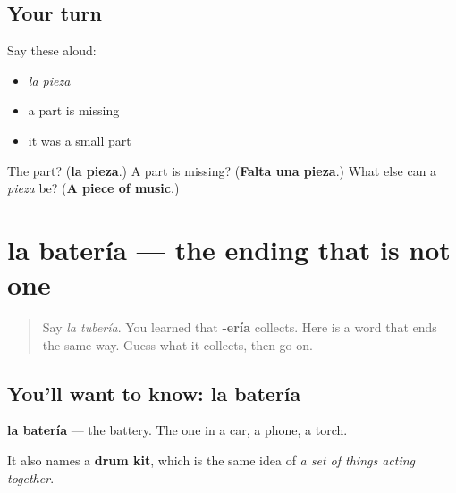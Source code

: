 \subsection*{Your turn}
Say these aloud:

\begin{itemize}
\raggedright
  \item \emph{la pieza}
  \item a part is missing
  \item it was a small part
\end{itemize}

\begin{tcolorbox}[breakable,colback=teal!4,colframe=teal!35!black,title={Before you move on}]
The part? (\textbf{la pieza}.) A part is missing? (\textbf{Falta una pieza}.) What else can a \emph{pieza} be? (\textbf{A piece of music}.)
\end{tcolorbox}
\section[la batería]{la batería — the ending that is not one}

\label{lesson:ES-C434-bateria}



\begin{quote}
Say \emph{la tubería}. You learned that \textbf{-ería} collects. Here is a word that ends the same way. Guess what it collects, then go on.
\end{quote}

\subsection*{You'll want to know: la batería}
\textbf{la batería} — the battery. The one in a car, a phone, a torch.

It also names a \textbf{drum kit}, which is the same idea of \emph{a set of things acting together}.

